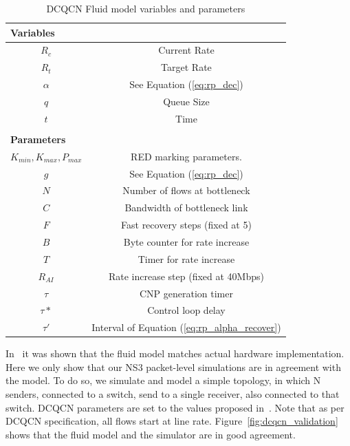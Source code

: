 \begin{table}
\center
{
\footnotesize
{
\begin{tabular}{|c|c|}
\multicolumn{2}{l}{\bf Variables} \\ \hline
$R_c$ & Current Rate \\ \hline
$R_t$ & Target Rate \\ \hline
$\alpha$ & See Equation (\ref{eq:rp_dec}) \\ \hline
$q$ & Queue Size \\ \hline
$t$ & Time \\ \hline
\multicolumn{2}{c}{} \\
\multicolumn{2}{l}{\bf Parameters} \\ \hline
$K_{min}, K_{max}, P_{max}$ & RED marking parameters. \\ \hline
$g$ & See Equation (\ref{eq:rp_dec}) \\ \hline
$N$ & Number of flows at bottleneck\\ \hline
$C$ & Bandwidth of bottleneck link\\ \hline
$F$ & Fast recovery steps (fixed at 5) \\ \hline
$B$ & Byte counter for rate increase\\ \hline
$T$ & Timer for rate increase\\ \hline
$R_{AI}$ & Rate increase step (fixed at 40Mbps)\\ \hline
$\tau$ & CNP generation timer \\ \hline
$\tau *$ & Control loop delay \\ \hline
$\tau '$ & Interval of Equation (\ref{eq:rp_alpha_recover})\\ \hline
\end{tabular}
}
}
\caption{DCQCN Fluid model variables and parameters}
\vspace{-0.5em}
\label{tab:dcqcn_varparam}
\end{table}

In~\cite{dcqcn} it was shown that the fluid model matches actual hardware
implementation. Here we only show that our NS3 packet-level
simulations are in agreement with the model.  To do so, we simulate and model a
simple topology, in which N senders, connected to a switch, send to a single
receiver, also connected to that switch. DCQCN parameters are set to the values
proposed in~\cite{dcqcn}. Note that as per DCQCN specification, all flows start
at line rate. Figure~\ref{fig:dcqcn_validation} shows that the fluid model
and the simulator are in good agreement.

